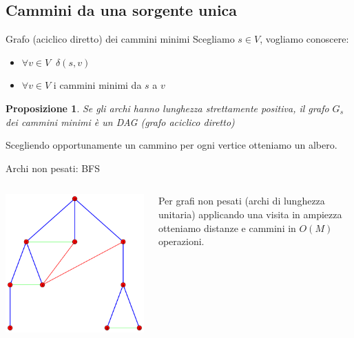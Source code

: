 \documentclass{beamer}
\newcounter{counter1}
\theoremstyle{plain}
\newtheorem{mypro}[counter1]{Proposizione}
\theoremstyle{definition}
\theoremstyle{remark}
\newcommand{\pa}[1]{\left(#1\right)}
\begin{document}
\subsection{Cammini da una sorgente unica}

\begin{frame}{Grafo (aciclico diretto) dei cammini minimi}
  Scegliamo $s\in V$, vogliamo conoscere:
  \begin{itemize}
  \item $\forall v\in V\;\; \delta \pa{s,v}$
  \item $\forall v\in V$ i cammini minimi da $s$ a $v$
  \end{itemize}
  \pause 
  
  \begin{mypro}
    Se gli archi hanno lunghezza strettamente positiva, il grafo $G_s$
    dei cammini minimi \`e un DAG (grafo aciclico diretto)
  \end{mypro}
  Scegliendo opportunamente un cammino per ogni vertice otteniamo un
  albero.
\end{frame}

\begin{frame}{Archi non pesati: BFS}
    \begin{columns}
    \begin{column}{0.40\textwidth}
      \includegraphics[width=\textwidth]{BFS}
    \end{column}
    \begin{column}{0.58\textwidth}
      Per grafi non pesati (archi di lunghezza unitaria) applicando
      una visita in ampiezza otteniamo distanze e cammini in
      $O\pa{M}$ operazioni.
    \end{column}
  \end{columns}
\end{frame}
\end{document}
